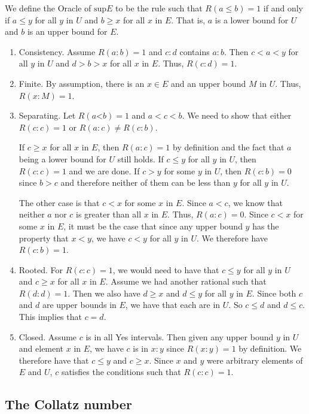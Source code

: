 \documentclass[12pt]{article}
\theoremstyle{remark}
\newcommand{\lt}{\mathord{<}}
\begin{document}
We define the Oracle of $\mathrm{sup} E$ to be the rule such that $R(a\leq b) = 1$ if and only if $a \leq y$ for all $y$ in $U$ and $b \geq x$ for all $x$ in $E$. That is, $a$ is a lower bound for $U$ and $b$ is an upper bound for $E$.

\begin{enumerate}
    \item Consistency. Assume $R(a:b)=1$ and $c:d$ contains $a:b$. Then $c < a < y$ for all $y$ in $U$ and $d > b > x$ for all $x$ in $E$. Thus, $R(c:d) = 1$.
    \item Finite. By assumption, there is an $x \in E$ and an upper bound $M$ in $U$. Thus, $R(x:M) = 1$. 
    \item Separating. Let $R(a\lt b)=1$ and $a < c< b$. We need to show that either $R(c:c)=1$ or $R(a:c) \neq R(c:b)$. 
    
    If $c \geq x$ for all $x$ in $E$, then $R(a:c)=1$ by definition and the fact that $a$ being a lower bound for $U$ still holds. If $c \leq y$ for all $y$ in $U$, then $R(c:c)=1$ and we are done. If $c > y$ for some $y$ in $U$, then $R(c:b) = 0$ since $b > c$ and therefore neither of them can be less than $y$ for all $y$ in $U$. 
    
    The other case is that $c < x$ for some $x$ in $E$. Since $a < c$, we know that neither $a$ nor $c$ is greater than all $x$ in $E$. Thus, $R(a:c) = 0$. Since $c < x$ for some $x$ in $E$, it must be the case that since any upper bound $y$ has the property that $x < y$, we have $c < y$ for all $y$ in $U$. We therefore have $R(c:b)=1$.
    
    \item Rooted. For $R(c:c)=1$, we would need to have that $c \leq y$ for all $y$ in $U$ and $c \geq x$ for all $x$ in $E$. Assume we had another rational such that $R(d:d) = 1$. Then we also have $d \geq x$ and $d \leq y$ for all $y$ in $E$. Since both $c$ and $d$ are upper bounds in $E$, we have that each are in $U$. So $c \leq d$ and $d \leq c$. This implies that $c = d$. 
    \item Closed. Assume $c$ is in all Yes intervals. Then given any upper bound $y$ in $U$ and element $x$ in $E$, we have $c$ is in $x:y$ since $R(x:y)=1$ by definition. We therefore have that $c \leq y$ and $c \geq x$. Since $x$ and $y$ were arbitrary elements of $E$ and $U$, $c$ satisfies the conditions such that $R(c:c)=1$.
\end{enumerate}


\subsection{The Collatz number}
\end{document}
